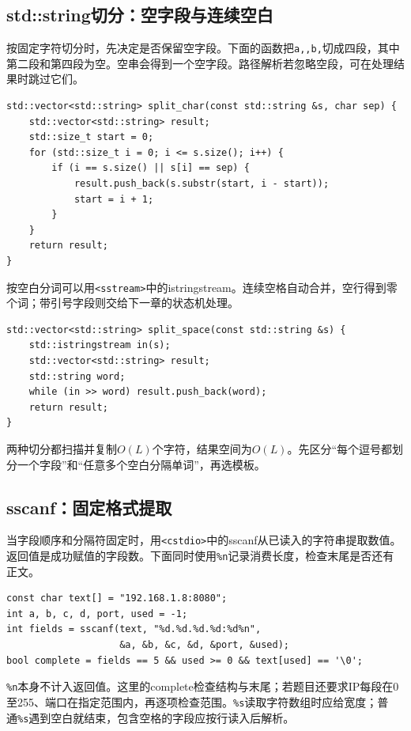 \subsection{std::string切分：空字段与连续空白}
按固定字符切分时，先决定是否保留空字段。下面的函数把\texttt{a,,b,}切成四段，其中第二段和第四段为空。空串会得到一个空字段。路径解析若忽略空段，可在处理结果时跳过它们。
\begin{lstlisting}
std::vector<std::string> split_char(const std::string &s, char sep) {
    std::vector<std::string> result;
    std::size_t start = 0;
    for (std::size_t i = 0; i <= s.size(); i++) {
        if (i == s.size() || s[i] == sep) {
            result.push_back(s.substr(start, i - start));
            start = i + 1;
        }
    }
    return result;
}
\end{lstlisting}
按空白分词可以用\texttt{<sstream>}中的istringstream。连续空格自动合并，空行得到零个词；带引号字段则交给下一章的状态机处理。
\begin{lstlisting}
std::vector<std::string> split_space(const std::string &s) {
    std::istringstream in(s);
    std::vector<std::string> result;
    std::string word;
    while (in >> word) result.push_back(word);
    return result;
}
\end{lstlisting}
两种切分都扫描并复制$O(L)$个字符，结果空间为$O(L)$。先区分“每个逗号都划分一个字段”和“任意多个空白分隔单词”，再选模板。

\subsection{sscanf：固定格式提取}
当字段顺序和分隔符固定时，用\texttt{<cstdio>}中的sscanf从已读入的字符串提取数值。返回值是成功赋值的字段数。下面同时使用\texttt{\%n}记录消费长度，检查末尾是否还有正文。
\begin{lstlisting}
const char text[] = "192.168.1.8:8080";
int a, b, c, d, port, used = -1;
int fields = sscanf(text, "%d.%d.%d.%d:%d%n",
                    &a, &b, &c, &d, &port, &used);
bool complete = fields == 5 && used >= 0 && text[used] == '\0';
\end{lstlisting}
\texttt{\%n}本身不计入返回值。这里的complete检查结构与末尾；若题目还要求IP每段在0至255、端口在指定范围内，再逐项检查范围。\texttt{\%s}读取字符数组时应给宽度；普通\texttt{\%s}遇到空白就结束，包含空格的字段应按行读入后解析。

